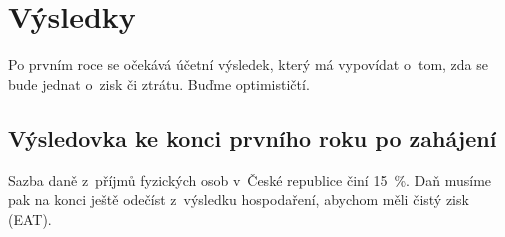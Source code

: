 \newpage



\section{Výsledky}

Po prvním roce se očekává účetní výsledek, který má vypovídat o~tom, zda se bude jednat o~zisk či ztrátu. Buďme optimističtí.

\subsection{Výsledovka ke konci prvního roku po zahájení}
Sazba daně z~příjmů fyzických osob v~České republice činí 15~\%. Daň musíme pak na konci ještě odečíst z~výsledku hospodaření, abychom měli čistý zisk (EAT).

